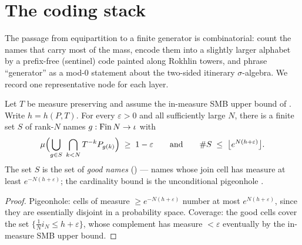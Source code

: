 \section{The coding stack}

The passage from equipartition to a finite generator is combinatorial: count the names that carry
most of the mass, encode them into a slightly larger alphabet by a prefix-free (sentinel) code
painted along Rokhlin towers, and phrase ``generator'' as a mod-\(0\) statement about the two-sided
itinerary \(\sigma\)-algebra. We record one representative node for each layer.

\begin{theorem}\label{exists_cover_names_card_le}
  \leanok
  Let \(T\) be measure preserving and assume the in-measure SMB upper bound of
  . Write \(h = h(P,T)\). For every \(\varepsilon > 0\) and all
  sufficiently large \(N\), there is a finite set \(S\) of rank-\(N\) names
  \(g : \operatorname{Fin} N \to \iota\) with
  \[
    \mu\Bigl(\bigcup_{g\in S}\;\bigcap_{k<N} T^{-k}P_{g(k)}\Bigr) \;\ge\; 1 - \varepsilon
    \qquad\text{and}\qquad
    \#S \;\le\; \bigl\lfloor e^{N(h+\varepsilon)} \bigr\rfloor.
  \]
  The set \(S\) is the set of \emph{good names} () --- names
  whose join cell has measure at least \(e^{-N(h+\varepsilon)}\); the cardinality bound is the
  unconditional pigeonhole .
\end{theorem}
\begin{proof}\leanok
  Pigeonhole: cells of measure \(\ge e^{-N(h+\varepsilon)}\) number at most
  \(e^{N(h+\varepsilon)}\), since they are essentially disjoint in a probability space. Coverage:
  the good cells cover the set \(\{\tfrac1N i_N \le h+\varepsilon\}\), whose complement has
  measure \(< \varepsilon\) eventually by the in-measure SMB upper bound.
\end{proof}

